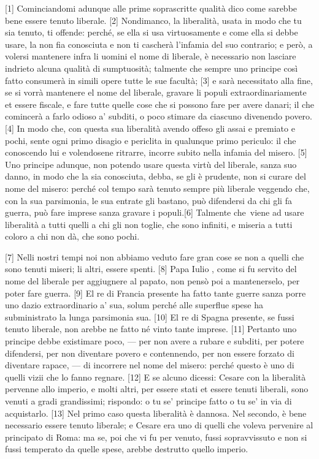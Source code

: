 
{[}1{]} Cominciandomi adunque alle prime soprascritte qualità dico come
sarebbe bene essere tenuto liberale. {[}2{]} Nondimanco, la liberalità,
usata in modo che tu sia tenuto, ti offende: perché, se ella si usa
virtuosamente e come ella si debbe usare, la non fia conosciuta e non ti
cascherà l'infamia del suo contrario; e però, a volersi mantenere infra
li uomini el nome di liberale, è necessario non lasciare indrieto alcuna
qualità di sumptuosità; talmente che sempre uno principe così fatto
consumerà in simili opere tutte le sue facultà; {[}3{]} e sarà
necessitato alla fine, se si vorrà mantenere el nome del liberale,
gravare li populi extraordinariamente et essere fiscale, e fare tutte
quelle cose che si possono fare per avere danari; il che comincerà a
farlo odioso a' subditi, o poco stimare da ciascuno divenendo povero.
{[}4{]} In modo che, con questa sua liberalità avendo offeso gli assai e
premiato e pochi, sente ogni primo disagio e periclita in qualunque
primo periculo: il che conoscendo lui e volendosene ritrarre, incorre
subito nella infamia del misero. {[}5{]} Uno principe adunque, non
potendo usare questa virtù del liberale, sanza suo danno, in modo che la
sia conosciuta, debba, se gli è prudente, non si curare del nome del
misero: perché col tempo sarà tenuto sempre più liberale veggendo che,
con la sua parsimonia, le sua entrate gli bastano, può difendersi da chi
gli fa guerra, può fare imprese sanza gravare i populi.{[}6{]} Talmente
che\est\ viene ad usare liberalità a tutti quelli a chi gli non toglie, che
sono infiniti, e miseria a tutti coloro a chi non dà, che sono pochi.

{[}7{]} Nelli nostri tempi noi non abbiamo veduto fare gran cose se non
a quelli che sono tenuti miseri; li altri, essere spenti. {[}8{]} Papa
Iulio , come si fu servito del nome del liberale per aggiugnere al
papato, non pensò poi a mantenerselo, per poter fare guerra. {[}9{]} El
re di Francia presente ha fatto tante guerre sanza porre uno dazio
extraordinario a' sua, solum perché alle superflue spese ha
subministrato la lunga parsimonia sua. {[}10{]} El re di Spagna
presente, se fussi tenuto liberale, non arebbe ne fatto né vinto tante
imprese. {[}11{]} Pertanto uno principe debbe existimare poco, --- per
non avere a rubare e subditi, per potere difendersi, per non diventare
povero e contennendo, per non essere forzato di diventare rapace, --- di
incorrere nel nome del misero: perché questo è uno di quelli vizii che
lo fanno regnare. {[}12{]} E se alcuno dicessi: Cesare con la liberalità
pervenne allo imperio, e molti altri, per essere stati et essere tenuti
liberali, sono venuti a gradi grandissimi; rispondo: o tu se' principe
fatto o tu se' in via di acquistarlo. {[}13{]} Nel primo caso questa
liberalità è dannosa. Nel secondo, è bene necessario essere tenuto
liberale; e Cesare era uno di quelli che voleva pervenire al principato
di Roma: ma se, poi che vi fu per venuto, fussi sopravvissuto e non si
fussi temperato da quelle spese, arebbe destrutto quello imperio.

